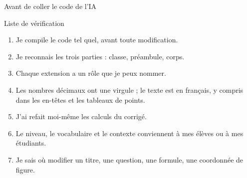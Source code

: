 \begin{frame}{Avant de coller le code de l'IA}
  \begin{Rem}{Liste de vérification}
    \small
    \begin{enumerate}
      \item Je compile le code tel quel, avant toute modification.
      \item Je reconnais les trois parties : classe, préambule, corps.
      \item Chaque extension a un rôle que je peux nommer.
      \item Les nombres décimaux ont une virgule ; le texte est en
        français, y compris dans les en-têtes et les tableaux de points.
      \item J'ai refait moi-même les calculs du corrigé.
      \item Le niveau, le vocabulaire et le contexte conviennent à mes
        élèves ou à mes étudiants.
      \item Je sais où modifier un titre, une question, une formule, une
        coordonnée de figure.
    \end{enumerate}
  \end{Rem}
\end{frame}
